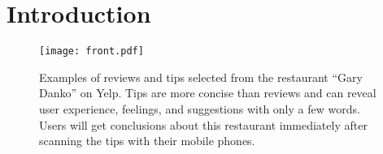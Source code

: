 \documentclass[sigconf]{acmart}
\begin{document}





\maketitle




\section{Introduction}
\label{section1}

\begin{figure}[!t]
	\centering
	\texttt{[image: front.pdf]}
	\caption{
		Examples of reviews and tips selected from the restaurant ``Gary Danko'' on Yelp. Tips are more concise than reviews and can reveal user experience, feelings, and suggestions with only a few words. Users will get conclusions about this restaurant immediately after scanning the tips with their mobile phones.
	}
	\label{fig:front}
	\vspace{0mm}
\end{figure}
\end{document}
